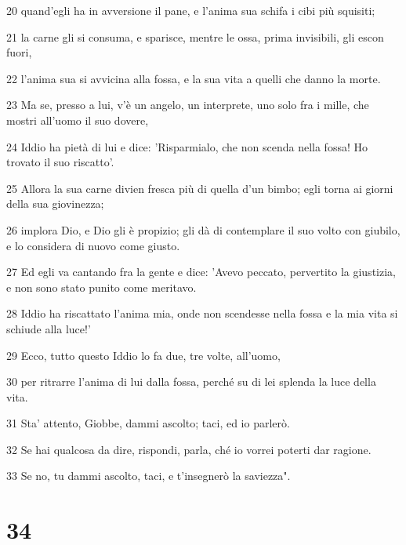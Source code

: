 \par 20 quand'egli ha in avversione il pane, e l'anima sua schifa i cibi più squisiti;
\par 21 la carne gli si consuma, e sparisce, mentre le ossa, prima invisibili, gli escon fuori,
\par 22 l'anima sua si avvicina alla fossa, e la sua vita a quelli che danno la morte.
\par 23 Ma se, presso a lui, v'è un angelo, un interprete, uno solo fra i mille, che mostri all'uomo il suo dovere,
\par 24 Iddio ha pietà di lui e dice: 'Risparmialo, che non scenda nella fossa! Ho trovato il suo riscatto'.
\par 25 Allora la sua carne divien fresca più di quella d'un bimbo; egli torna ai giorni della sua giovinezza;
\par 26 implora Dio, e Dio gli è propizio; gli dà di contemplare il suo volto con giubilo, e lo considera di nuovo come giusto.
\par 27 Ed egli va cantando fra la gente e dice: 'Avevo peccato, pervertito la giustizia, e non sono stato punito come meritavo.
\par 28 Iddio ha riscattato l'anima mia, onde non scendesse nella fossa e la mia vita si schiude alla luce!'
\par 29 Ecco, tutto questo Iddio lo fa due, tre volte, all'uomo,
\par 30 per ritrarre l'anima di lui dalla fossa, perché su di lei splenda la luce della vita.
\par 31 Sta' attento, Giobbe, dammi ascolto; taci, ed io parlerò.
\par 32 Se hai qualcosa da dire, rispondi, parla, ché io vorrei poterti dar ragione.
\par 33 Se no, tu dammi ascolto, taci, e t'insegnerò la saviezza".

\chapter{34}

